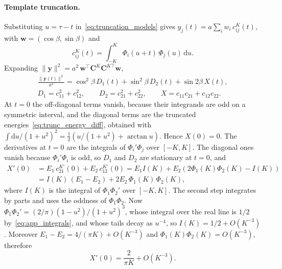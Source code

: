 \paragraph{Template truncation.}
Substituting $u = \tau - t$ in~\eqref{eq:truncation_models} gives $y_j(t) = a\sum_i w_i\, c^K_{ij}(t)$, with $\mathbf{w} = (\cos\beta, \sin\beta)$ and
\begin{equation}
c^K_{ij}(t) = \int_{-K}^{K} \Phi_i(u + t)\,\Phi_j(u)\,\mathrm{d}u.
\label{eq:app_cK}
\end{equation}
Expanding $\|\mathbf{y}\|^2 = a^2\,\mathbf{w}^{\top}\mathbf{C}^K\mathbf{C}^{K\top}\mathbf{w}$,
\begin{equation}
\begin{gathered}
\frac{\|\mathbf{y}(t)\|^2}{a^2} = \cos^2\beta\, D_1(t) + \sin^2\beta\, D_2(t) + \sin 2\beta\, X(t),\\
D_1 = c_{11}^2 + c_{12}^2, \qquad D_2 = c_{21}^2 + c_{22}^2, \qquad X = c_{11}c_{21} + c_{12}c_{22}.
\end{gathered}
\label{eq:app_energy_expansion}
\end{equation}
At $t = 0$ the off-diagonal terms vanish, because their integrands are odd on a symmetric interval, and the diagonal terms are the truncated energies~\eqref{eq:trunc_energy_diff}, obtained with $\int \mathrm{d}u/(1+u^2)^2 = \tfrac{1}{2}\left(u/(1+u^2) + \arctan u\right)$. Hence $X(0) = 0$. The derivatives at $t = 0$ are the integrals of $\Phi_i'\Phi_j$ over $[-K, K]$. The diagonal ones vanish because $\Phi_i'\Phi_i$ is odd, so $D_1$ and $D_2$ are stationary at $t = 0$, and
\begin{equation}
\begin{aligned}
X'(0) &= E_1\, c^{K\prime}_{21}(0) + E_2\, c^{K\prime}_{12}(0) = E_1 I(K) + E_2\left(2\Phi_1(K)\Phi_2(K) - I(K)\right)\\
&= I(K)\,(E_1 - E_2) + 2E_2\,\Phi_1(K)\,\Phi_2(K),
\end{aligned}
\label{eq:app_Xprime}
\end{equation}
where $I(K)$ is the integral of $\Phi_1\Phi_2'$ over $[-K, K]$. The second step integrates by parts and uses the oddness of $\Phi_1\Phi_2$. Now $\Phi_1\Phi_2' = (2/\pi)(1 - u^2)/(1 + u^2)^3$, whose integral over the real line is $1/2$ by~\eqref{eq:app_integrals}, and whose tails decay as $u^{-4}$, so $I(K) = 1/2 + O(K^{-3})$. Moreover $E_1 - E_2 = 4/(\pi K) + O(K^{-3})$ and $\Phi_1(K)\Phi_2(K) = O(K^{-3})$, therefore
\begin{equation}
X'(0) = \frac{2}{\pi K} + O(K^{-3}).
\label{eq:app_Xprime_asym}
\end{equation}
